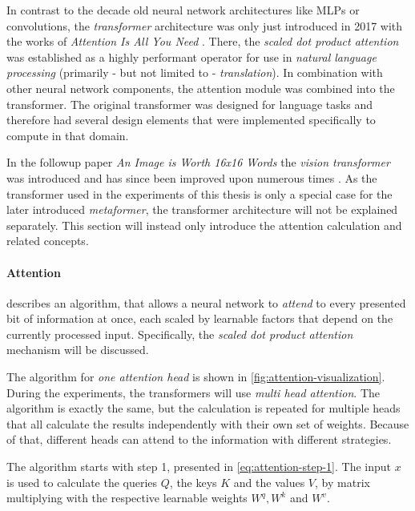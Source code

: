 In contrast to the decade old neural network architectures like MLPs or convolutions, the \emph{transformer} architecture was only just introduced in 2017 with the works of \emph{Attention Is All You Need} \cite{attentionIsAllYouNeed}.
There, the \emph{scaled dot product attention} was established as a highly performant operator for use in \emph{natural language processing} (primarily - but not limited to - \emph{translation}).
In combination with other neural network components, the attention module was combined into the transformer.
The original transformer was designed for language tasks and therefore had several design elements that were implemented specifically to compute in that domain.

In the followup paper \emph{An Image is Worth 16x16 Words} \cite{imageWorth16x16} the \emph{vision transformer} was introduced and has since been improved upon numerous times \cite{swinTransformerPaper}.
As the transformer used in the experiments of this thesis is only a special case for the later introduced \emph{metaformer}, the transformer architecture will not be explained separately. 
This section will instead only introduce the attention calculation and related concepts.

\FloatBarrier
\paragraph{Attention} describes an algorithm, that allows a neural network to \emph{attend} to every presented bit of information at once, each scaled by learnable factors that depend on the currently processed input.
Specifically, the \emph{scaled dot product attention} mechanism will be discussed.

The algorithm for \emph{one attention head} is shown in \autoref{fig:attention-visualization}.
During the experiments, the transformers will use \emph{multi head attention}. 
The algorithm is exactly the same, but the calculation is repeated for multiple \glqq heads\grqq{} that all calculate the results independently with their own set of weights. 
Because of that, different heads can attend to the information with different strategies.

The algorithm starts with step 1, presented in \autoref{eq:attention-step-1}.
The input $x$ is used to calculate the queries $Q$, the keys $K$ and the values $V$, by matrix multiplying with the respective learnable weights $W^q, W^k$ and $W^v$.

